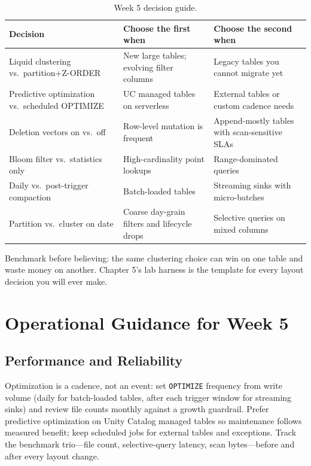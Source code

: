 \begin{table}[H]
\centering
\small
\begin{tabular}{@{}p{3.4cm}p{4.4cm}p{4.6cm}@{}}
\toprule
\textbf{Decision} & \textbf{Choose the first when} & \textbf{Choose the second when} \\
\midrule
Liquid clustering vs.\ partition+Z-ORDER & New large tables; evolving filter columns & Legacy tables you cannot migrate yet \\
Predictive optimization vs.\ scheduled OPTIMIZE & UC managed tables on serverless & External tables or custom cadence needs \\
Deletion vectors on vs.\ off & Row-level mutation is frequent & Append-mostly tables with scan-sensitive SLAs \\
Bloom filter vs.\ statistics only & High-cardinality point lookups & Range-dominated queries \\
Daily vs.\ post-trigger compaction & Batch-loaded tables & Streaming sinks with micro-batches \\
Partition vs.\ cluster on date & Coarse day-grain filters and lifecycle drops & Selective queries on mixed columns \\
\bottomrule
\end{tabular}
\caption{Week 5 decision guide.}
\label{tab:ch5-decisions}
\end{table}

Benchmark before believing: the same clustering choice can win on one table and waste money on another. Chapter 5's lab harness is the template for every layout decision you will ever make.

\section{Operational Guidance for Week 5}
%
\subsection{Performance and Reliability}
Optimization is a cadence, not an event: set \texttt{OPTIMIZE} frequency from write volume (daily for batch-loaded tables, after each trigger window for streaming sinks) and review file counts monthly against a growth guardrail. Prefer predictive optimization on Unity Catalog managed tables so maintenance follows measured benefit; keep scheduled jobs for external tables and exceptions. Track the benchmark trio---file count, selective-query latency, scan bytes---before and after every layout change.

